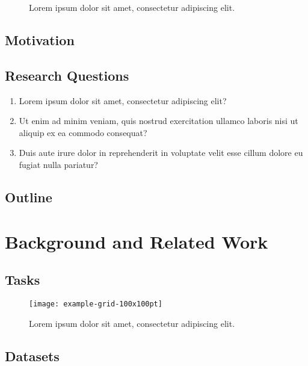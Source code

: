 \documentclass[letterpaper, 12pt, oneside, doublespacing]{Thesis}
\begin{document}
\begin{figure}
  \centering
  \qquad
  \caption{Lorem ipsum dolor sit amet, consectetur adipiscing elit.}
  \label{fig:fig_1}
\end{figure}



\section{Motivation}

\section{Research Questions}
\begin{enumerate}
  \item Lorem ipsum dolor sit amet, consectetur adipiscing elit?
  \item Ut enim ad minim veniam, quis nostrud exercitation ullamco laboris nisi ut aliquip ex ea commodo consequat?
  \item Duis aute irure dolor in reprehenderit in voluptate velit esse cillum dolore eu fugiat nulla pariatur?
\end{enumerate}


\section{Outline}


\chapter{Background and Related Work}

\section{Tasks}\label{sec:tasks}

\begin{figure}
  \centering
  \texttt{[image: example-grid-100x100pt]}
  \caption{Lorem ipsum dolor sit amet, consectetur adipiscing elit.}
  \label{fig:vrd_ocr}
\end{figure}


\section{Datasets}\label{sec:datasets}
\end{document}
